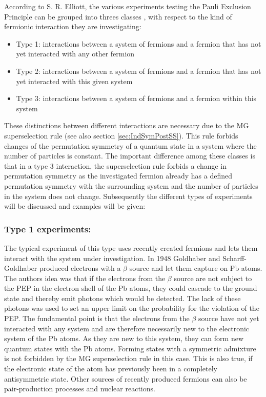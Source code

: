 According to S. R. Elliott, the various experiments testing the Pauli Exclusion Principle can be grouped into threes classes \cite{Elliott2012}, with respect to the kind of fermionic interaction they are investigating:
\begin{itemize}
 \item Type 1: interactions between a system of fermions and a fermion that has not yet interacted with any other fermion
 \item Type 2: interactions between a system of fermions and a fermion that has not yet interacted with this given system
 \item Type 3: interactions between a system of fermions and a fermion within this system
\end{itemize}
These distinctions between different interactions are necessary due to the MG superselection rule (see also section \ref{sec:IndSymPostSS}). This rule forbids changes of the permutation symmetry of a quantum state in a system where the number of particles is constant. The important difference among these classes is that in a type 3 interaction, the superselection rule forbids a change in permutation symmetry as the investigated fermion already has a defined permutation symmetry with the surrounding system and the number of particles in the system does not change. Subsequently the different types of experiments will be discussed and examples will be given:

\subsubsection{Type 1 experiments:}

The typical experiment of this type uses recently created fermions and lets them interact with the system under investigation. In 1948 Goldhaber and Scharff-Goldhaber \cite{Goldhaber1948} produced electrons with a $\beta$ source and let them capture on Pb atoms. The authors idea was that if the electrons from the $\beta$ source are not subject to the PEP in the electron shell of the Pb atoms, they could cascade to the ground state and thereby emit photons which would be detected. The lack of these photons was used to set an upper limit on the probability for the violation of the PEP. The fundamental point is that the electrons from the $\beta$ source have not yet interacted with any system and are therefore necessarily new to the electronic system of the Pb atoms. As they are new to this system, they can form new quantum states with the Pb atoms. Forming states with a symmetric admixture is not forbidden by the MG superselection rule in this case. This is also true, if the electronic state of the atom has previously been in a completely antisymmetric state. Other sources of recently produced fermions can also be pair-production processes and nuclear reactions.

